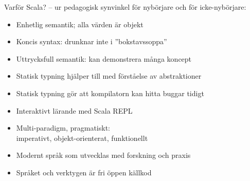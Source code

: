 \begin{Slide}{Varför Scala? -- ur pedagogisk synvinkel}
 för nybörjare och  för icke-nybörjare:
\begin{itemize}
\item Enhetlig semantik; alla värden är objekt
\item Koncis syntax: drunknar inte i ''bokstavssoppa''
\item Uttrycksfull semantik: kan demonstrera många koncept
\item Statisk typning hjälper till med förståelse av abstraktioner
\item Statisk typning gör att kompilatorn kan hitta buggar tidigt
\item Interaktivt lärande med Scala REPL
\item Multi-paradigm, pragmatiskt: \\ imperativt, objekt-orienterat, funktionellt
\item Modernt språk som utvecklas med forskning och praxis
\item Språket och verktygen är fri öppen källkod
\end{itemize}
\end{Slide}

